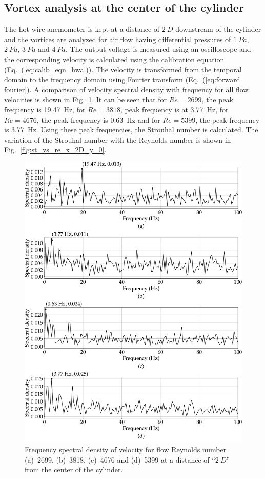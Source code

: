 \subsection{Vortex analysis at the center of the cylinder}
The hot wire anemometer is kept at a distance of $2~D$ downstream of the cylinder and the vortices are analyzed for air flow having differential pressures of $1~Pa$, $2~Pa$, $3~Pa$ and $4~Pa$. The output voltage is measured using an oscilloscope and the corresponding velocity is calculated using the calibration equation (Eq.~(\ref{eq:calib_eqn_hwa})). The velocity is transformed from the temporal domain to the frequency domain using Fourier transform (Eq.~(\ref{eq:forward fourier}).  A comparison of velocity spectral density with frequency for all flow velocities is shown in Fig.~\ref{fig:surface_x_2D_y_0}. It can be seen that for $Re = 2699$, the peak frequency is 19.47~Hz, for $Re = 3818$, peak frequency is at 3.77~Hz, for $Re = 4676$, the peak frequency is 0.63~Hz and for $Re = 5399$, the peak frequency is 3.77~Hz. Using these peak frequencies, the Strouhal number is calculated. The variation of the Strouhal number with the Reynolds number is shown in Fig.~\ref{fig:st_vs_re_x_2D_y_0}. 
\begin{figure}
    \centering
    \includegraphics[width=\linewidth]{gfx/FFT_all_freq_x_2D_y_0.pdf}
    \caption{Frequency spectral density of velocity for flow Reynolds number (a)~2699, (b)~3818, (c)~4676 and (d)~5399 at a distance of \enquote{$2~D$} from the center of the cylinder.}
    \label{fig:surface_x_2D_y_0}
\end{figure}

